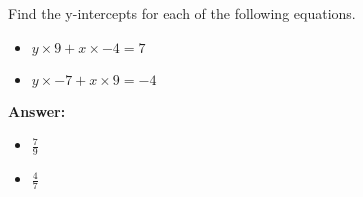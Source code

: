 Find the y-intercepts for each of the following equations. \begin{itemize}\item \( y \times 9 + x \times -4 = 7 \)\item \( y \times -7 + x \times 9 = -4 \)\end{itemize}

        \textbf{Answer:} \begin{itemize}\item \( \frac{7}{9} \)\item \( \frac{4}{7} \)\end{itemize}
